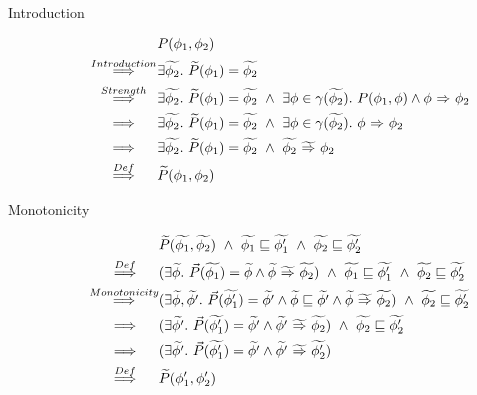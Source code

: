 \begin{proofatend}~\\
    \begin{description}
        \item[Introduction] 
        \begin{align*}
        &P(\phi_1, \phi_2) \\
        \overset{Introduction}{~\quad\implies\quad~} 
        &\exists \widetilde{\phi_2}.~ \widetilde{P}(\phi_1) = \widetilde{\phi_2}\\
        \overset{Strength}{~\quad\implies\quad~} 
        &\exists \widetilde{\phi_2}.~ \widetilde{P}(\phi_1) = \widetilde{\phi_2} ~\wedge~ \exists \phi \in \gamma(\widetilde{\phi_2}).~ P(\phi_1, \phi) \wedge {\phi} \,\,{\Rightarrow}\,\, {\phi_2} \\
        \overset{}{~\quad\implies\quad~} 
        &\exists \widetilde{\phi_2}.~ \widetilde{P}(\phi_1) = \widetilde{\phi_2} ~\wedge~ \exists \phi \in \gamma(\widetilde{\phi_2}).~ {\phi} \,\,{\Rightarrow}\,\, {\phi_2} \\
        \overset{}{~\quad\implies\quad~} 
        &\exists \widetilde{\phi_2}.~ \widetilde{P}(\phi_1) = \widetilde{\phi_2} ~\wedge~  {\widetilde{\phi_2}} \,\,{\widetilde{\Rightarrow}}\,\, {\phi_2} \\
        \overset{Def}{~\quad\implies\quad~} 
        &\widetilde{P}(\phi_1, \phi_2)
        \end{align*}
        
        \item[Monotonicity] 
        \begin{align*}
        &\widetilde{P}(\widetilde{\phi_1}, \widetilde{\phi_2}) ~\wedge~ \widetilde{\phi_1} \sqsubseteq \widetilde{\phi_1'} ~\wedge~ \widetilde{\phi_2} \sqsubseteq \widetilde{\phi_2'}\\
        \overset{Def}{~\quad\implies\quad~}
        &(\exists \widetilde{\phi}.~ \vec{P}(\widetilde{\phi_1}) = \widetilde{\phi} \wedge {\widetilde{\phi}} \,\,{\widetilde{\Rightarrow}}\,\, {\widetilde{\phi_2}}) ~\wedge~ \widetilde{\phi_1} \sqsubseteq \widetilde{\phi_1'} ~\wedge~ \widetilde{\phi_2} \sqsubseteq \widetilde{\phi_2'}\\
        \overset{Monotonicity}{~\quad\implies\quad~}
        &(\exists \widetilde{\phi}, \widetilde{\phi'}.~ \vec{P}(\widetilde{\phi_1'}) = \widetilde{\phi'} \wedge \widetilde{\phi} \sqsubseteq \widetilde{\phi'} \wedge {\widetilde{\phi}} \,\,{\widetilde{\Rightarrow}}\,\, {\widetilde{\phi_2}}) ~\wedge~ \widetilde{\phi_2} \sqsubseteq \widetilde{\phi_2'}\\
        \overset{}{~\quad\implies\quad~} 
        &(\exists \widetilde{\phi'}.~ \vec{P}(\widetilde{\phi_1'}) = \widetilde{\phi'} \wedge {\widetilde{\phi'}} \,\,{\widetilde{\Rightarrow}}\,\, {\widetilde{\phi_2}}) ~\wedge~ \widetilde{\phi_2} \sqsubseteq \widetilde{\phi_2'}\\
        \overset{}{~\quad\implies\quad~} 
        &(\exists \widetilde{\phi'}.~ \vec{P}(\widetilde{\phi_1'}) = \widetilde{\phi'} \wedge {\widetilde{\phi'}} \,\,{\widetilde{\Rightarrow}}\,\, {\widetilde{\phi_2'}})\\
        \overset{Def}{~\quad\implies\quad~} 
        &\widetilde{P}(\phi_1', \phi_2') \\
        \end{align*}
    \end{description}
\end{proofatend}

